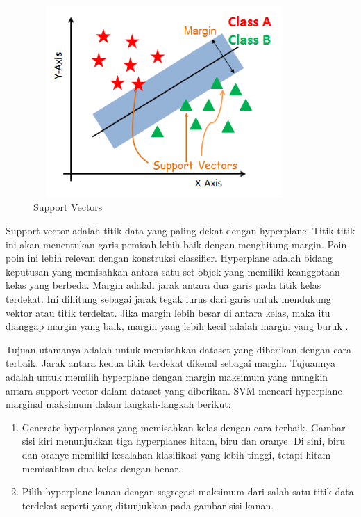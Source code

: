 \begin{figure}[H]
	\centering
	\includegraphics[width=10cm, height=7.3cm]{gambar/index3_souoaz}
	\caption{Support Vectors}
	\label{index3_souoaz}
\end{figure}

\par Support vector adalah titik data yang paling dekat dengan hyperplane. Titik-titik ini akan menentukan garis pemisah lebih baik dengan menghitung margin. Poin-poin ini lebih relevan dengan konstruksi classifier. Hyperplane adalah bidang keputusan yang memisahkan antara satu set objek yang memiliki keanggotaan kelas yang berbeda. Margin adalah jarak antara dua garis pada titik kelas terdekat. Ini dihitung sebagai jarak tegak lurus dari garis untuk mendukung vektor atau titik terdekat. Jika margin lebih besar di antara kelas, maka itu dianggap margin yang baik, margin yang lebih kecil adalah margin yang buruk \citep{Campbell2010}.

\par Tujuan utamanya adalah untuk memisahkan dataset yang diberikan dengan cara terbaik. Jarak antara kedua titik terdekat dikenal sebagai margin. Tujuannya adalah untuk memilih hyperplane dengan margin maksimum yang mungkin antara support vector dalam dataset yang diberikan. SVM mencari hyperplane marginal maksimum dalam langkah-langkah berikut:

\begin{enumerate}[1.]
	\itemsep0em
	\item Generate hyperplanes yang memisahkan kelas dengan cara terbaik. Gambar sisi kiri menunjukkan tiga hyperplanes hitam, biru dan oranye. Di sini, biru dan oranye memiliki kesalahan klasifikasi yang lebih tinggi, tetapi hitam memisahkan dua kelas dengan benar.

	\item Pilih hyperplane kanan dengan segregasi maksimum dari salah satu titik data terdekat seperti yang ditunjukkan pada gambar sisi kanan.
\end{enumerate}

